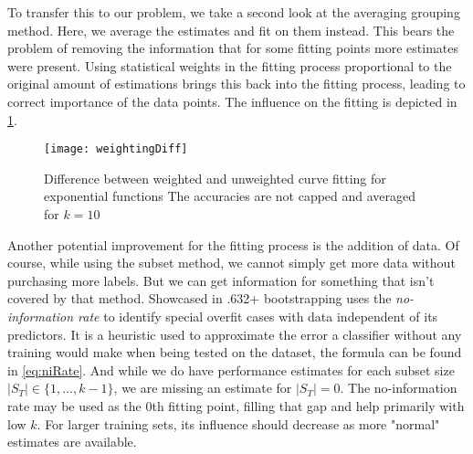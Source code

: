 To transfer this to our problem, we take a second look at the averaging grouping method. Here, we average the estimates and fit on them instead. This bears the problem of removing the information that for some fitting points more estimates were present. Using statistical weights in the fitting process proportional to the original amount of estimations brings this back into the fitting process, leading to correct importance of the data points. The influence on the fitting is depicted in \ref{fig:weigthingExample}.

\begin{figure}[h]
	\centering
	\texttt{[image: weightingDiff]}
	\caption{Difference between weighted and unweighted curve fitting for exponential functions The accuracies are not capped and averaged for $k = 10$}
	\label{fig:weigthingExample}
\end{figure}

Another potential improvement for the fitting process is the addition of data. Of course, while using the subset method, we cannot simply get more data without purchasing more labels. But we can get information for something that isn't covered by that method. Showcased in \cite{EfronEtAl1997} .632+ bootstrapping uses the \textit{no-information rate} to identify special overfit cases with data independent of its predictors. It is a heuristic used to approximate the error a classifier without any training would make when being tested on the dataset, the formula can be found in \eqref{eq:niRate}. And while we do have performance estimates for each subset size $|S_T| \in \{1, ..., k-1\}$, we are missing an estimate for $|S_T| = 0$. The no-information rate may be used as the 0th fitting point, filling that gap and help primarily with low $k$. For larger training sets, its influence should decrease as more "normal" estimates are available.
